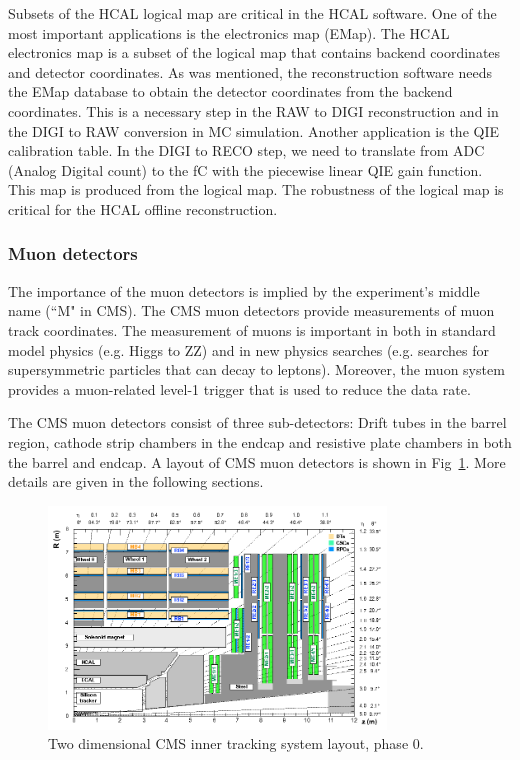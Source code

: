 Subsets of the HCAL logical map are critical in the HCAL software. One of the most important applications is the electronics map (EMap). The HCAL electronics map is a subset of the logical map that contains backend coordinates and detector coordinates. As was mentioned, the reconstruction software needs the EMap database to obtain the detector coordinates from the backend coordinates. This is a necessary step in the RAW to DIGI reconstruction and in the DIGI to RAW conversion in MC simulation. Another application is the QIE calibration table. In the DIGI to RECO step, we need to translate from ADC (Analog Digital count) to the fC with the piecewise linear QIE gain function. This map is produced from the logical map. The robustness of the logical map is critical for the HCAL offline reconstruction. 

\subsubsection{Muon detectors}

The importance of the muon detectors is implied by the experiment’s middle name (``M" in CMS). The CMS muon detectors provide measurements of muon track coordinates. The measurement of muons is important in both in standard model physics (e.g. Higgs to ZZ) and in new physics searches (e.g. searches for supersymmetric particles that can decay to leptons). Moreover, the muon system provides a muon-related level-1 trigger that is used to reduce the data rate.

The CMS muon detectors consist of three sub-detectors: Drift tubes in the barrel region, cathode strip chambers in the endcap and resistive plate chambers in both the barrel and endcap. A layout of CMS muon detectors is shown in Fig~\ref{fig:c3cms2dmuondets}. More details are given in the following sections. 

\begin{figure}[htbp]
 \begin{center}
  \includegraphics[width=0.8\textwidth]{figures/c3/c3_cms_2dmuondets.png}
 \end{center}
 \caption{Two dimensional CMS inner tracking system layout, phase 0.}
 \label{fig:c3cms2dmuondets}
\end{figure}

